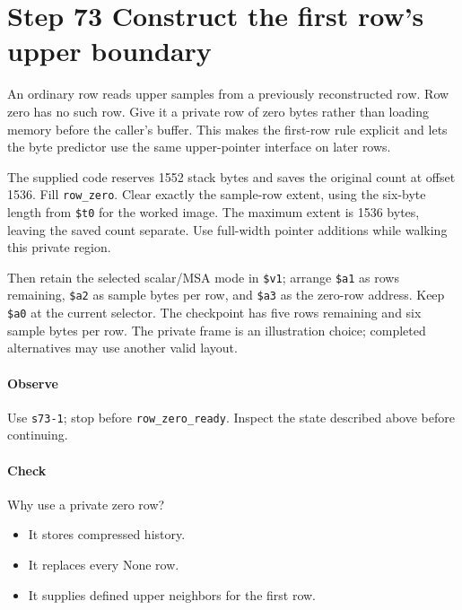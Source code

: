 \section{Step 73 Construct the first row’s upper boundary}
An ordinary row reads upper samples from a previously reconstructed row. Row zero has no such row. Give it a private row of zero bytes rather than loading memory before the caller’s buffer. This makes the first-row rule explicit and lets the byte predictor use the same upper-pointer interface on later rows.

The supplied code reserves 1552 stack bytes and saves the original count at offset 1536. Fill \texttt{row\_zero}. Clear exactly the sample-row extent, using the six-byte length from \texttt{\$t0} for the worked image. The maximum extent is 1536 bytes, leaving the saved count separate. Use full-width pointer additions while walking this private region.

Then retain the selected scalar/MSA mode in \texttt{\$v1}; arrange \texttt{\$a1} as rows remaining, \texttt{\$a2} as sample bytes per row, and \texttt{\$a3} as the zero-row address. Keep \texttt{\$a0} at the current selector. The checkpoint has five rows remaining and six sample bytes per row. The private frame is an illustration choice; completed alternatives may use another valid layout.

\paragraph{Observe} Use \texttt{s73-1}; stop before \texttt{row\_zero\_ready}. Inspect the state described above before continuing.

\paragraph{Check} Why use a private zero row?
\begin{itemize}
\item[A.] It stores compressed history.
\item[B.] It replaces every None row.
\item[C.] It supplies defined upper neighbors for the first row.
\end{itemize}
